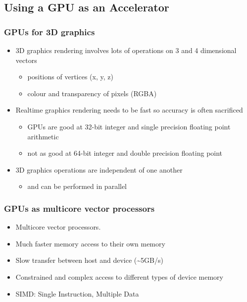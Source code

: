 \subsection{Using a GPU as an
Accelerator}\label{using-a-gpu-as-an-accelerator}

\subsubsection{GPUs for 3D graphics}\label{gpus-for-3d-graphics}

\begin{itemize}
\itemsep1pt\parskip0pt
\item
  3D graphics rendering involves lots of operations on 3 and 4
  dimensional vectors

  \begin{itemize}
  \itemsep1pt\parskip0pt
  \item
    positions of vertices (x, y, z)
  \item
    colour and transparency of pixels (RGBA)
  \end{itemize}
\item
  Realtime graphics rendering needs to be fast so accuracy is often
  sacrificed

  \begin{itemize}
  \itemsep1pt\parskip0pt
  \item
    GPUs are good at 32-bit integer and single precision floating point
    arithmetic
  \item
    not as good at 64-bit integer and double precision floating point
  \end{itemize}
\item
  3D graphics operations are independent of one another

  \begin{itemize}
  \itemsep1pt\parskip0pt
  \item
    and can be performed in parallel
  \end{itemize}
\end{itemize}

\subsubsection{GPUs as multicore vector
processors}\label{gpus-as-multicore-vector-processors}

\begin{itemize}
\itemsep1pt\parskip0pt
\item
  Multicore vector processors.
\item
  Much faster memory access to their own memory
\item
  Slow transfer between host and device (\textasciitilde{}5GB/s)
\item
  Constrained and complex access to different types of device memory
\item
  SIMD: Single Instruction, Multiple Data
\end{itemize}

